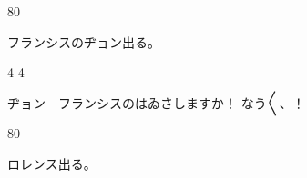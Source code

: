 \documentclass[tate,paper=b6j,jafontsize=9pt]{jlreq}
\begin{document}
\begin{azconvIndented}{8\zw}{0\zw}

フランシスのヂョン出る。

\end{azconvIndented}
\begin{azconvIndented}{4\zw}{-4\zw}

ヂョン　フランシスのはゐさしますか！ なう{〳〵}、！

\end{azconvIndented}
\begin{azconvIndented}{8\zw}{0\zw}

ロレンス出る。

\end{azconvIndented}
\end{document}
